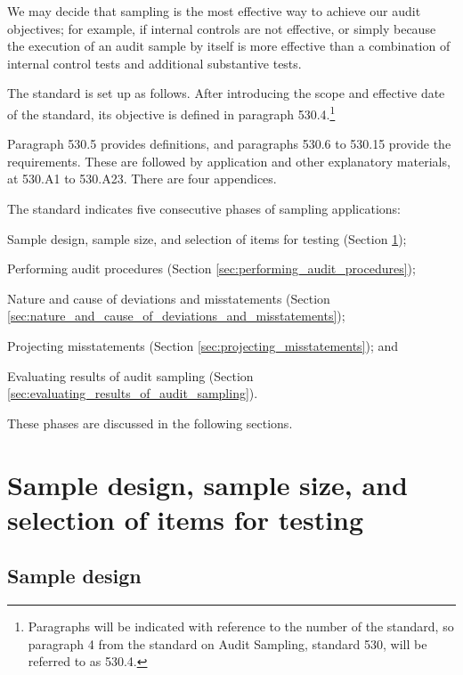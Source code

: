 We may decide that sampling is the most effective way to achieve our audit objectives; for example, if internal controls are not effective, or simply because the execution of an audit sample by itself is more effective than a combination of internal control tests and additional substantive tests.

\bigskip
The standard is set up as follows. After introducing the scope and effective date of the standard, its objective is defined in paragraph 530.4.\footnote{Paragraphs will be indicated with reference to the number of the standard, so paragraph 4 from the standard on Audit Sampling, standard 530, will be referred to as 530.4.} 

Paragraph 530.5 provides definitions, and paragraphs 530.6 to 530.15 provide the requirements. These are followed by application and other explanatory materials, at 530.A1 to 530.A23. There are four appendices.

\bigskip
The standard indicates five consecutive phases of sampling ap\-pli\-cations:
\begin{compactitem}
\item Sample design, sample size, and selection of items for testing (Section \ref{sec:sample_design_size_and_selection_of_items_for_testing});
\item Performing audit procedures (Section \ref{sec:performing_audit_procedures}); 
\item Nature and cause of deviations and misstatements (Section \ref{sec:nature_and_cause_of_deviations_and_misstatements});
\item Projecting misstatements (Section \ref{sec:projecting_misstatements}); and
\item Evaluating results of audit sampling (Section \ref{sec:evaluating_results_of_audit_sampling}).
\end{compactitem}

\noindent These phases are discussed in the following sections. 

\section{Sample design, sample size, and selection of items for testing} %
\label{sec:sample_design_size_and_selection_of_items_for_testing}

\subsection{Sample design} %
\label{sub:sampling_method}

